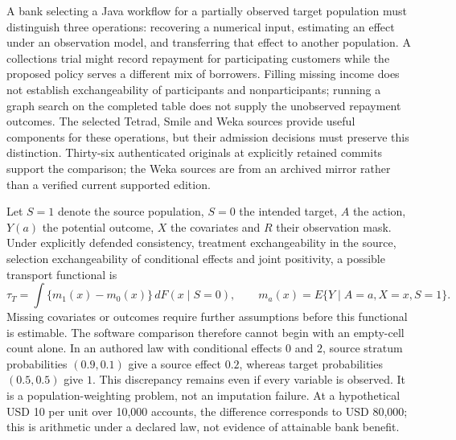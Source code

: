 A bank selecting a Java workflow for a partially observed target population must distinguish three operations: recovering a numerical input, estimating an effect under an observation model, and transferring that effect to another population. A collections trial might record repayment for participating customers while the proposed policy serves a different mix of borrowers. Filling missing income does not establish exchangeability of participants and nonparticipants; running a graph search on the completed table does not supply the unobserved repayment outcomes. The selected Tetrad, Smile and Weka sources provide useful components for these operations, but their admission decisions must preserve this distinction. Thirty-six authenticated originals at explicitly retained commits support the comparison; the Weka sources are from an archived mirror rather than a verified current supported edition.~\citep{exec25_jtm_tetrad,exec25_jtm_smile,exec25_jtm_weka}

Let $S=1$ denote the source population, $S=0$ the intended target, $A$ the action, $Y(a)$ the potential outcome, $X$ the covariates and $R$ their observation mask. Under explicitly defended consistency, treatment exchangeability in the source, selection exchangeability of conditional effects and joint positivity, a possible transport functional is
\[
 \tau_T=\int\{m_1(x)-m_0(x)\}\,dF(x\mid S=0),
 \qquad m_a(x)=E\{Y\mid A=a,X=x,S=1\}.
\]
Missing covariates or outcomes require further assumptions before this functional is estimable. The software comparison therefore cannot begin with an empty-cell count alone. In an authored law with conditional effects $0$ and $2$, source stratum probabilities $(0.9,0.1)$ give a source effect $0.2$, whereas target probabilities $(0.5,0.5)$ give $1$. This discrepancy remains even if every variable is observed. It is a population-weighting problem, not an imputation failure. At a hypothetical USD 10 per unit over 10,000 accounts, the difference corresponds to USD 80,000; this is arithmetic under a declared law, not evidence of attainable bank benefit.~\citep{exec25_jtm_choice}

